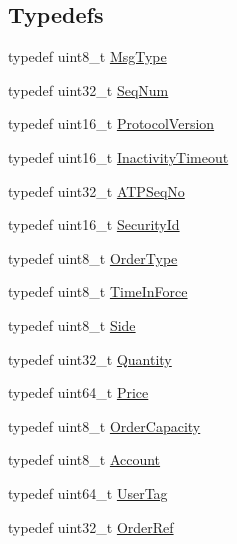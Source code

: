 \subsection*{Typedefs}
\begin{DoxyCompactItemize}
\item 
typedef uint8\+\_\+t \hyperlink{namespaceMetal_1_1Aquis_ac6c095b7eefa1d7918de0fe9387f3786}{Msg\+Type}
\item 
typedef uint32\+\_\+t \hyperlink{namespaceMetal_1_1Aquis_a2e28795915a9bf76ccc4574a24376487}{Seq\+Num}
\item 
typedef uint16\+\_\+t \hyperlink{namespaceMetal_1_1Aquis_afb46afcc05843e2d28f9e4a57bedca72}{Protocol\+Version}
\item 
typedef uint16\+\_\+t \hyperlink{namespaceMetal_1_1Aquis_aa9b1c4c30c2f68cc03b4fe9ca2a7cd14}{Inactivity\+Timeout}
\item 
typedef uint32\+\_\+t \hyperlink{namespaceMetal_1_1Aquis_a1cd395dbf71a74cc9a7565053bf63a7f}{A\+T\+P\+Seq\+No}
\item 
typedef uint16\+\_\+t \hyperlink{namespaceMetal_1_1Aquis_a822c1f3c19e277e264ba31d810cadbea}{Security\+Id}
\item 
typedef uint8\+\_\+t \hyperlink{namespaceMetal_1_1Aquis_aedaac80110efc9b37a08e697501250ba}{Order\+Type}
\item 
typedef uint8\+\_\+t \hyperlink{namespaceMetal_1_1Aquis_afb13b4ac40f6f0b4f0085bfd9572b42d}{Time\+In\+Force}
\item 
typedef uint8\+\_\+t \hyperlink{namespaceMetal_1_1Aquis_ae45bfb9f528bd35d5f31d9ba1b9eafcf}{Side}
\item 
typedef uint32\+\_\+t \hyperlink{namespaceMetal_1_1Aquis_aa25d3bf823ec854f4e93eee2c5f0b529}{Quantity}
\item 
typedef uint64\+\_\+t \hyperlink{namespaceMetal_1_1Aquis_a83ca009113cb4fca87827adfee66bcbd}{Price}
\item 
typedef uint8\+\_\+t \hyperlink{namespaceMetal_1_1Aquis_ac8ffebbdb8def9d93b29ba3fc6878e09}{Order\+Capacity}
\item 
typedef uint8\+\_\+t \hyperlink{namespaceMetal_1_1Aquis_acbe82ae737d4c087f18f1af8aabd1d26}{Account}
\item 
typedef uint64\+\_\+t \hyperlink{namespaceMetal_1_1Aquis_a9e7c42d4dce76e920bc18eb66b799cf4}{User\+Tag}
\item 
typedef uint32\+\_\+t \hyperlink{namespaceMetal_1_1Aquis_a9d9056c8752e245df5a2c554ce6d3d1a}{Order\+Ref}
\end{DoxyCompactItemize}

